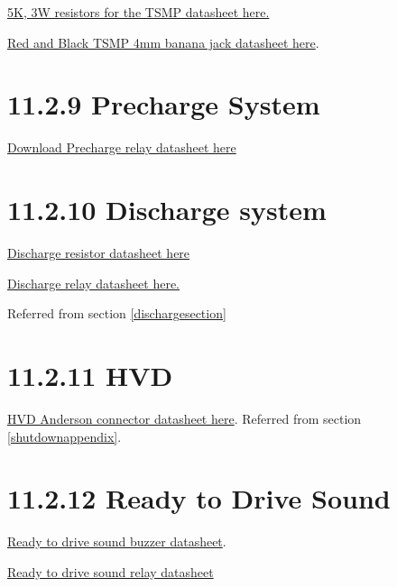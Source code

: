 \documentclass{article}
\begin{document}
\href{http://www.vishay.com/docs/31800/alsralvr.pdf}{5K, 3W resistors for the TSMP datasheet here.}

\href{http://www.mouser.com/ds/2/159/D72930_02_10_06-21562.pdf}{Red and Black TSMP 4mm banana jack datasheet here}.

\section*{11.2.9 Precharge System}
\label{prechargeappendix}

\href{http://store.sirces.it/it_it/fileuploader/download/download/?d=0&file=custom%2Fupload%2FFile-1422979472.pdf}{Download Precharge relay datasheet here}

\section*{11.2.10 Discharge system} \label{dischargeappendix}

\href{http://www.mouser.com/ProductDetail/Welwyn-Components-TT-Electronics/WH50-220RJI/?qs=sGAEpiMZZMtbXrIkmrvidKReuDgpkN0wvzK1C2F8Chg%3d}{Discharge resistor datasheet here}

\href{http://cotorelay.com/product/5500-series-high-voltage-reed-relays/}{Discharge relay datasheet here.}

Referred from section \ref{dischargesection}

\section*{11.2.11 HVD } \label{hvdappendix}

\href{http://www.andersonpower.com/_global-assets/downloads/pdf/ds-smart.pdf}{HVD Anderson connector datasheet here}. Referred from section \ref{shutdownappendix}.

\section*{11.2.12 Ready to Drive Sound} \label{r2dappendix}

\href{http://www.mouser.com/ds/2/252/SC648ANR-63353.pdf}{Ready to drive sound buzzer datasheet}.

\href{https://www.google.com/url?sa=t&rct=j&q=&esrc=s&source=web&cd=2&cad=rja&uact=8&ved=0ahUKEwjUmLXFsZTNAhUOQ1IKHUBABfMQFggjMAE&url=http%3A%2F%2Fwww.te.com%2Fcommerce%2FDocumentDelivery%2FDDEController%3FAction%3Dsrchrtrv%26DocNm%3DSDTR_series_relay_data_sheet_E%26DocType%3DDS%26DocLang%3DEN&usg=AFQjCNFPrP2GCsVBBcjG06uzsufdRJApUg&sig2=UJHaD8QEI6-wrWDhAknKJw}{Ready to drive sound relay datasheet}
\end{document}
